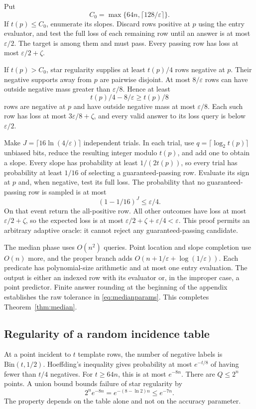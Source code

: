 \documentclass[11pt,letterpaper,pmlr,twoside]{jmlr}
\newcommand{\eps}{\varepsilon}
\newcommand{\ceil}[1]{\lceil #1\rceil}
\begin{document}
Put
\[
 C_0=\max\{64n,\ceil{128/\eps}\}.
\]
If $t(p)\le C_0$, enumerate its slopes. Discard rows positive at $p$ using the entry evaluator, and test the full loss of each remaining row until an answer is at most $\eps/2$. The target is among them and must pass. Every passing row has loss at most $\eps/2+\zeta$.

If $t(p)>C_0$, star regularity supplies at least $t(p)/4$ rows negative at $p$. Their negative supports away from $p$ are pairwise disjoint. At most $8/\eps$ rows can have outside negative mass greater than $\eps/8$. Hence at least
\[
 t(p)/4-8/\eps\ge t(p)/8
\]
rows are negative at $p$ and have outside negative mass at most $\eps/8$. Each such row has loss at most $3\eps/8+\zeta$, and every valid answer to its loss query is below $\eps/2$.

Make $J=\ceil{16\ln(4/\eps)}$ independent trials. In each trial, use $q=\ceil{\log_2t(p)}$ unbiased bits, reduce the resulting integer modulo $t(p)$, and add one to obtain a slope. Every slope has probability at least $1/(2t(p))$, so every trial has probability at least $1/16$ of selecting a guaranteed-passing row. Evaluate its sign at $p$ and, when negative, test its full loss. The probability that no guaranteed-passing row is sampled is at most
\[
 (1-1/16)^J\le\eps/4.
\]
On that event return the all-positive row. All other outcomes have loss at most $\eps/2+\zeta$, so the expected loss is at most $\eps/2+\zeta+\eps/4<\eps$. This proof permits an arbitrary adaptive oracle: it cannot reject any guaranteed-passing candidate.

The median phase uses $O(n^2)$ queries. Point location and slope completion use $O(n)$ more, and the proper branch adds $O(n+1/\eps+\log(1/\eps))$. Each predicate has polynomial-size arithmetic and at most one entry evaluation. The output is either an indexed row with its evaluator or, in the improper case, a point predictor. Finite answer rounding at the beginning of the appendix establishes the raw tolerance in \eqref{eq:medianparams}. This completes Theorem~\ref{thm:median}.

\subsection{Regularity of a random incidence table}
At a point incident to $t$ template rows, the number of negative labels is $\mathrm{Bin}(t,1/2)$. Hoeffding's inequality gives probability at most $e^{-t/8}$ of having fewer than $t/4$ negatives. For $t\ge64n$, this is at most $e^{-8n}$. There are $Q\le2^n$ points. A union bound bounds failure of star regularity by
\[
 2^n e^{-8n}=e^{-(8-\ln2)n}\le e^{-7n}.
\]
The property depends on the table alone and not on the accuracy parameter.
\end{document}
